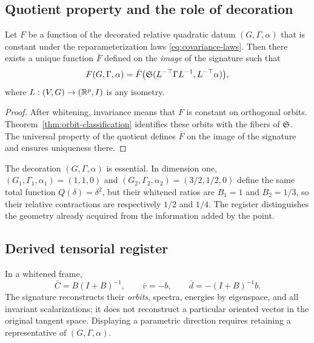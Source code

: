 \subsection{Quotient property and the role of decoration}
\begin{corollary}
Let $F$ be a function of the decorated relative quadratic datum $(G,\Gamma,\alpha)$ that is constant under the reparameterization laws \eqref{eq:covariance-laws}. Then there exists a unique function $\bar F$ defined on the \emph{image} of the signature such that
\begin{equation}
F(G,\Gamma,\alpha)
=\bar F\bigl(\mathfrak S(L^{-\top}\Gamma L^{-1},L^{-\top}\alpha)\bigr),
\end{equation}
where $L:(V,G)\to(\mathbb{R}^p,I)$ is any isometry.
\end{corollary}
\begin{proof}
After whitening, invariance means that $F$ is constant on orthogonal orbits. Theorem~\ref{thm:orbit-classification} identifies these orbits with the fibers of $\mathfrak S$. The universal property of the quotient defines $\bar F$ on the image of the signature and ensures uniqueness there.
\end{proof}

\begin{remark}
The decoration $(G,\Gamma,\alpha)$ is essential. In dimension one, $(G_1,\Gamma_1,\alpha_1)=(1,1,0)$ and $(G_2,\Gamma_2,\alpha_2)=(3/2,1/2,0)$ define the same total function $Q(\delta)=\delta^2$, but their whitened ratios are $B_1=1$ and $B_2=1/3$, so their relative contractions are respectively $1/2$ and $1/4$. The register distinguishes the geometry already acquired from the information added by the point.
\end{remark}

\subsection{Derived tensorial register}
In a whitened frame,
\begin{equation}
\bar C=B(I+B)^{-1},
\qquad
\bar v=-b,
\qquad
\bar d=-(I+B)^{-1}b.
\label{eq:canonical-register}
\end{equation}
The signature reconstructs their \emph{orbits}, spectra, energies by eigenspace, and all invariant scalarizations; it does not reconstruct a particular oriented vector in the original tangent space. Displaying a parametric direction requires retaining a representative of $(G,\Gamma,\alpha)$.

